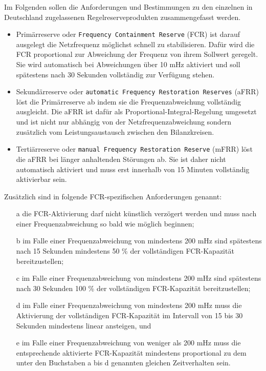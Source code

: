 Im Folgenden sollen die Anforderungen und Bestimmungen zu den einzelnen in Deutschland zugelassenen Regelreserveprodukten 
zusammengefasst werden.

\begin{itemize}
    \item Primärreserve oder \texttt{Frequency Containment Reserve} (FCR) ist darauf ausgelegt die Netzfrequenz möglichst schnell zu stabilisieren. Dafür wird die FCR proportional zur Abweichung der Frequenz von ihrem Sollwert geregelt. Sie wird automatisch bei Abweichungen über 10 mHz aktiviert und soll spätestens nach 30 Sekunden vollständig zur Verfügung stehen.
    \item Sekundärreserve oder \texttt{automatic Frequency Restoration Reserves} (aFRR) löst die Primärreserve ab indem sie die Frequenzabweichung vollständig ausgleicht. Die aFRR ist dafür als Proportional-Integral-Regelung umgesetzt und ist nicht nur abhängig von der Netzfrequenzabweichung sondern zusätzlich vom Leistungsaustausch zwischen den Bilanzkreisen.
    \item Tertiärreserve oder \texttt{manual Frequency Restoration Reserve} (mFRR) löst die aFRR bei länger anhaltenden Störungen ab. Sie ist daher nicht automatisch aktiviert und muss erst innerhalb von 15 Minuten vollständig aktivierbar sein.
\end{itemize}

Zusätzlich sind in \parencite[]{Verordnung} folgende FCR-spezifischen Anforderungen genannt:
\begin{itemize}
    \item [\glqq{} a] die FCR-Aktivierung darf nicht künstlich verzögert werden und muss nach einer Frequenzabweichung so bald wie möglich beginnen;
    \item [b] im Falle einer Frequenzabweichung von mindestens 200 mHz sind spätestens nach 15 Sekunden mindestens 50 \% der vollständigen FCR-Kapazität bereitzustellen;
    \item [c] im Falle einer Frequenzabweichung von mindestens 200 mHz sind spätestens nach 30 Sekunden 100 \% der vollständigen FCR-Kapazität bereitzustellen;
    \item [d] im Falle einer Frequenzabweichung von mindestens 200 mHz muss die Aktivierung der vollständigen FCR-Kapazität im Intervall von 15 bis 30 Sekunden mindestens linear ansteigen, und 
    \item [e] im Falle einer Frequenzabweichung von weniger als 200 mHz muss die entsprechende aktivierte FCR-Kapazität mindestens proportional zu dem unter den Buchstaben a bis d genannten gleichen Zeitverhalten sein.\grqq{}
\end{itemize}

